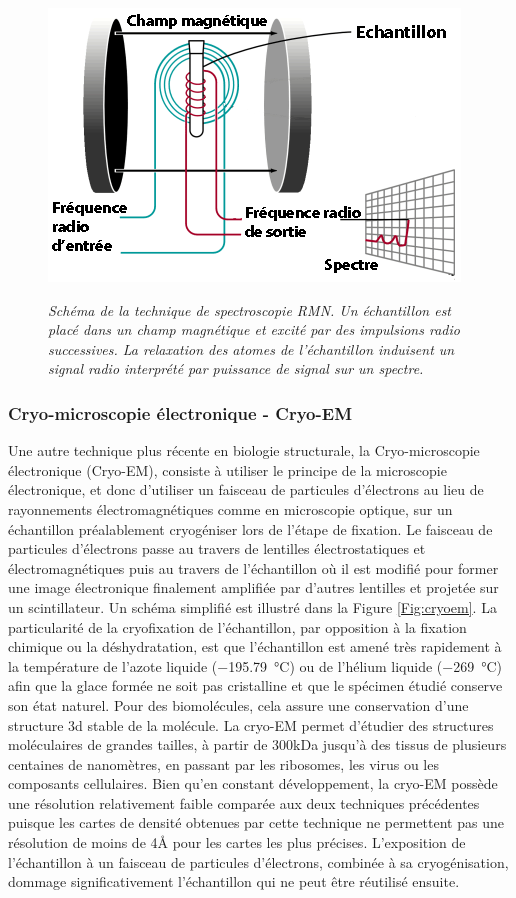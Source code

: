 \begin{figure}[h]
  \centering
  {\includegraphics[width=0.7\linewidth]{./figures/ch1/rmn.png}}
    \caption{\it Schéma de la technique de spectroscopie RMN. Un échantillon est placé dans un champ magnétique et excité par des impulsions radio successives. La relaxation des atomes de l'échantillon induisent un signal radio interprété par puissance de signal sur un spectre.}
    \label{Fig:rmn}
  \hspace{0.2cm}
\end{figure}

\subsubsection{Cryo-microscopie électronique - Cryo-EM}


Une autre technique plus récente en biologie structurale, la Cryo-microscopie électronique (Cryo-EM), consiste à utiliser le principe de la microscopie électronique, et donc d'utiliser un faisceau de particules d'électrons au lieu de rayonnements électromagnétiques comme en microscopie optique, sur un échantillon préalablement cryogéniser lors de l'étape de fixation. Le faisceau de particules d'électrons passe au travers de lentilles électrostatiques et électromagnétiques puis au travers de l'échantillon où il est modifié pour former une image électronique finalement amplifiée par d'autres lentilles et projetée sur un scintillateur. Un schéma simplifié est illustré dans la Figure \ref{Fig:cryoem}.
La particularité de la cryofixation de l'échantillon, par opposition à la fixation chimique ou la déshydratation, est que l'échantillon est amené très rapidement à la température de l'azote liquide (\SI{-195.79}{\degreeCelsius}) ou de l'hélium liquide (\SI{-269}{\degreeCelsius}) afin que la glace formée ne soit pas cristalline et que le spécimen étudié conserve son état naturel. Pour des biomolécules, cela assure une conservation d'une structure 3d stable de la molécule. La cryo-EM permet d'étudier des structures moléculaires de grandes tailles, à partir de 300kDa jusqu'à des tissus de plusieurs centaines de nanomètres, en passant par les ribosomes, les virus ou les composants cellulaires.
Bien qu'en constant développement, la cryo-EM possède une résolution relativement faible comparée aux deux techniques précédentes puisque les cartes de densité obtenues par cette technique ne permettent pas une résolution de moins de 4\r{A} pour les cartes les plus précises\cite{zhou_atomic_2011}. L'exposition de l'échantillon à un faisceau de particules d'électrons, combinée à sa cryogénisation, dommage significativement l'échantillon qui ne peut être réutilisé ensuite.

